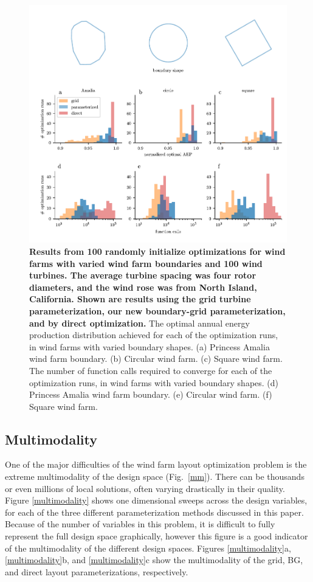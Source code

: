\documentclass[wes, manuscript]{copernicus}
\begin{document}
\begin{figure}
\centering
\includegraphics{paper-figures/results_boundsR1.pdf}
\caption{\textbf{Results from 100 randomly initialize optimizations for wind farms with varied wind farm boundaries and 100 wind turbines. The average turbine spacing was four rotor diameters, and the wind rose was from North Island, California. Shown are results using the grid turbine parameterization, our new boundary-grid parameterization, and by direct optimization.} The optimal annual energy production distribution achieved for each of the optimization runs, in wind farms with varied boundary shapes.  (a) Princess Amalia wind farm boundary. (b) Circular wind farm. (c) Square wind farm. The number of function calls required to converge for each of the optimization runs, in wind farms with varied boundary shapes.  (d) Princess Amalia wind farm boundary. (e) Circular wind farm. (f) Square wind farm. }
\label{results-bounds}
\end{figure}


\subsection{Multimodality}

One of the major difficulties of the wind farm layout optimization problem is the extreme multimodality of the design space (Fig.~\ref{mm}). There can be thousands or even millions of local solutions, often varying drastically in their quality. Figure \ref{multimodality} shows one dimensional sweeps across the design variables, for each of the three different parameterization methods discussed in this paper. Because of the number of variables in this problem, it is difficult to fully represent the full design space graphically, however this figure is a good indicator of the multimodality of the different design spaces. Figures \ref{multimodality}a, \ref{multimodality}b, and \ref{multimodality}c show the multimodality of the grid, BG, and direct layout parameterizations, respectively. 
\end{document}
